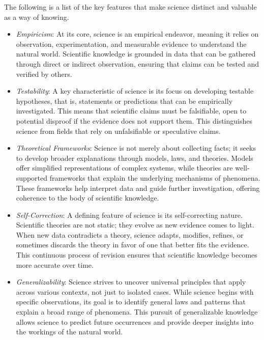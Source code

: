 The following is a list of the key features that make science distinct and valuable as a way of knowing.

\begin{itemize}

\item \emph{Empiricism}: At its core, science is an empirical endeavor, meaning it relies on observation, experimentation, and measurable evidence to understand the natural world. Scientific knowledge is grounded in data that can be gathered through direct or indirect observation, ensuring that claims can be tested and verified by others.

\item \emph{Testability}: A key characteristic of science is its focus on developing testable hypotheses, that is, statements or predictions that can be empirically investigated. This means that scientific claims must be falsifiable, open to potential disproof if the evidence does not support them. This distinguishes science from fields that rely on unfalsifiable or speculative claims.

\item \emph{Theoretical Frameworks}: Science is not merely about collecting facts; it seeks to develop broader explanations through models, laws, and theories. Models offer simplified representations of complex systems, while theories are well-supported frameworks that explain the underlying mechanisms of phenomena. These frameworks help interpret data and guide further investigation, offering coherence to the body of scientific knowledge.

\item \emph{Self-Correction}: A defining feature of science is its self-correcting nature. Scientific theories are not static; they evolve as new evidence comes to light. When new data contradicts a theory, science adapts, modifies, refines, or sometimes discards the theory in favor of one that better fits the evidence. This continuous process of revision ensures that scientific knowledge becomes more accurate over time.

\item \emph{Generalizability}: Science strives to uncover universal principles that apply across various contexts, not just to isolated cases. While science begins with specific observations, its goal is to identify general laws and patterns that explain a broad range of phenomena. This pursuit of generalizable knowledge allows science to predict future occurrences and provide deeper insights into the workings of the natural world.

\end{itemize}

